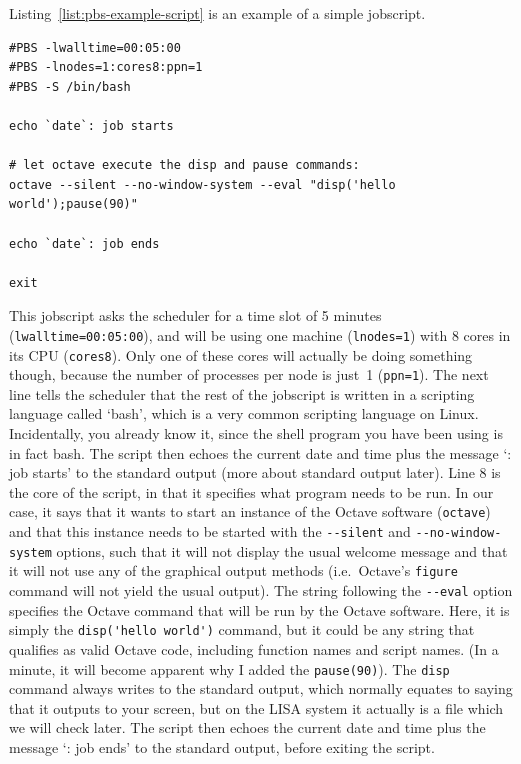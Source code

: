 Listing~\ref{list:pbs-example-script} is an example of a simple jobscript.


\begin{lstlisting}[style=basic,style=bash,style=numbered,caption={Example of a jobscript.},label=list:pbs-example-script]
#PBS -lwalltime=00:05:00
#PBS -lnodes=1:cores8:ppn=1
#PBS -S /bin/bash

echo `date`: job starts

# let octave execute the disp and pause commands:
octave --silent --no-window-system --eval "disp('hello world');pause(90)"

echo `date`: job ends

exit
\end{lstlisting}

This jobscript asks the scheduler for a time slot of 5 minutes (\lstinline[style=bashinline]{lwalltime=00:05:00}), and will be using one machine (\lstinline[style=bashinline]{lnodes=1}) with 8 cores in its CPU (\lstinline[style=bashinline]{cores8}). Only one of these cores will actually be doing something though, because the number of processes per node is just~1 (\lstinline[style=bashinline]{ppn=1}). The next line tells the scheduler that the rest of the jobscript is written in a scripting language called `bash'\label{word:bash}, which is a very common scripting language on Linux. Incidentally, you already know it, since the shell program you have been using is in fact bash. The script then echoes the current date and time plus the message `: job starts' to the standard output (more about standard output later).  Line 8 is the core of the script, in that it specifies what program needs to be run. In our case, it says that it wants to start an instance of the Octave software (\lstinline[style=bashinline]{octave}) and that this instance needs to be started with the \lstinline[style=bashinline]{--silent} and \lstinline[style=bashinline]{--no-window-system} options, such that it will not display the usual welcome message and that it will not use any of the graphical output methods (i.e.\, Octave's \lstinline[style=bashinline]{figure} command will not yield the usual output). The string following the \lstinline[style=bashinline]{--eval} option specifies the Octave command that will be run by the Octave software. Here, it is simply the \lstinline[style=bashinline]{disp('hello world')} command, but it could be any string that qualifies as valid Octave code, including function names and script names. (In a minute, it will become apparent why I added  the \lstinline[style=bashinline]{pause(90)}). The \lstinline[style=bashinline]{disp} command always writes to the standard output, which normally equates to saying that it outputs to your screen, but on the LISA system it actually is a file which we will check later. The script then echoes the current date and time plus the message `: job ends' to the standard output, before exiting the script.

